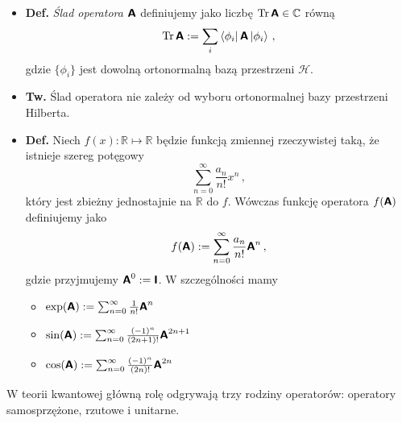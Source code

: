 \documentclass{myclass}
\begin{document}
\begin{itemize}
    \item \textbf{Def.} \textit{Ślad operatora \(\boldsymbol{\mathsf{A}}\)} definiujemy jako liczbę \(\Trace
    \oper{A} \in \mathbb{C}\) równą
    \begin{equation*}
        \Trace{\oper{A}} := \sum_{i} \bra{\phi_i}\oper{A}\ket{\phi_i}\,,
    \end{equation*}
    gdzie \(\{\phi_i\}\) jest dowolną ortonormalną bazą przestrzeni \(\mathscr{H}\).

    \item \textbf{Tw.} Ślad operatora nie zależy od wyboru ortonormalnej bazy przestrzeni Hilberta.

    \item \textbf{Def.} Niech \(f(x):\mathbb{R}\mapsto\mathbb{R}\) będzie funkcją zmiennej
    rzeczywistej taką, że istnieje szereg potęgowy
    \begin{equation*}
        \sum_{n=0}^\infty\frac{a_n}{n!}x^n\,,
    \end{equation*}
    który jest zbieżny jednostajnie na \(\mathbb{R}\) do \(f\). Wówczas funkcję operatora
    \(f(\boldsymbol{\mathsf{A}})\) definiujemy jako
    \begin{equation*}
        f(\boldsymbol{\mathsf{A}}) := \sum_{n=0}^\infty \frac{a_n}{n!}\boldsymbol{\mathsf{A}}^n\,,
    \end{equation*}
    gdzie przyjmujemy \(\boldsymbol{\mathsf{A}}^0 := \boldsymbol{\mathsf{I}}\). W szczególności mamy
    \begin{itemize}
        \item \(\exp(\boldsymbol{\mathsf{A}}) := \sum_{n=0}^\infty \frac{1}{n!}\boldsymbol{\mathsf{A}}^n\)
    
        \item \(\sin(\boldsymbol{\mathsf{A}}) := \sum_{n=0}^\infty \frac{(-1)^n}{(2n+1)!}\boldsymbol{\mathsf{A}}^{2n+1}\)
    
        \item \(\cos(\boldsymbol{\mathsf{A}}) := \sum_{n=0}^\infty \frac{(-1)^n}{(2n)!}\boldsymbol{\mathsf{A}}^{2n}\)
    
    \end{itemize}

\end{itemize}

W teorii kwantowej główną rolę odgrywają trzy rodziny operatorów: operatory samosprzężone, rzutowe i
unitarne.
\end{document}
